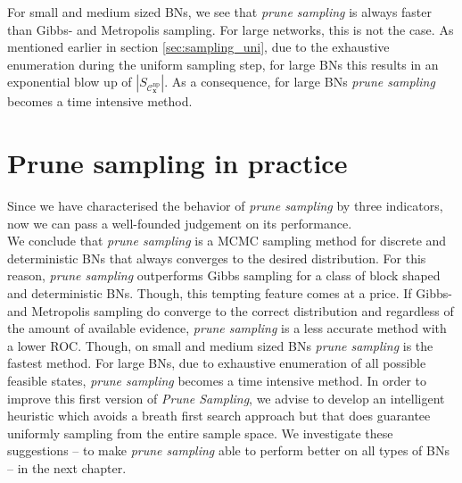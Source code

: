 \documentclass[a4paper, twoside, 11pt]{report}
\newcommand{\bfx}{{\mathbf{x}}}
\newcommand{\C}{{\mathcal C}}
\theoremstyle{plain}
\theoremstyle{definition}
\theoremstyle{remark}
\newcommand{\ps}{\textit{prune sampling }}
\begin{document}
For small and medium sized BNs, we see that \ps is always faster than Gibbs- and Metropolis sampling. For large networks, this is not the case. As mentioned earlier in section \ref{sec:sampling_uni}, due to the exhaustive enumeration during the uniform sampling step, for large BNs this results in an exponential blow up of $|S_{\C_\bfx^{\text{np}}}|$. As a consequence, for large BNs \ps becomes a time intensive method.

\section{Prune sampling in practice}
Since we have characterised the behavior of \textit{prune sampling} by three indicators, now we can pass a well-founded judgement on its performance. \\

We conclude that \ps is a MCMC sampling method for discrete and deterministic BNs that always converges to the desired distribution. For this reason, \ps outperforms Gibbs sampling for a class of block shaped and deterministic BNs. Though, this tempting feature comes at a price. If Gibbs- and Metropolis sampling do converge to the correct distribution and regardless of the amount of available evidence, \ps is a less accurate method with a lower ROC. Though, on small and medium sized BNs \ps is the fastest method. For large BNs, due to exhaustive enumeration of all possible feasible states, \ps becomes a time intensive method. In order to improve this first version of \textit{Prune Sampling}, we advise to develop an intelligent heuristic which avoids a breath first search approach but that does guarantee uniformly sampling from the entire sample space. We investigate these suggestions -- to make \ps able to perform better on all types of BNs -- in the next chapter.

%
%
\end{document}
